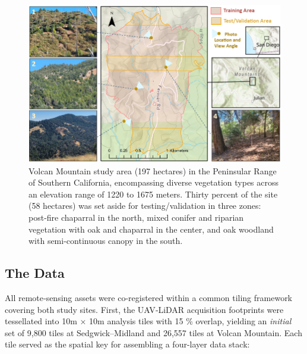 \documentclass[preprints,article,accept,pdftex,moreauthors]{Definitions/mdpi}
\begin{document}
\begin{figure}[!t]
    \centering
    \includegraphics[width=1\linewidth]{manuscript/figures/Volcan_Mtn_Study_Area.png}
    \caption{Volcan Mountain study area (197 hectares) in the Peninsular Range of Southern California, encompassing diverse vegetation types across an elevation range of 1220 to 1675 meters. Thirty percent of the site (58 hectares) was set aside for testing/validation in three zones: post-fire chaparral in the north, mixed conifer and riparian vegetation with oak and chaparral in the center, and oak woodland with semi-continuous canopy in the south. }
    \label{fig:volcan_mtn_study_area}
\end{figure}






\subsection{The Data}

All remote‐sensing assets were co-registered within a common tiling framework covering both study sites.  
First, the UAV‐LiDAR acquisition footprints were tessellated into 10m × 10m analysis tiles with 15 \% overlap, yielding an \emph{initial} set of 9,800 tiles at Sedgwick–Midland and 26,557 tiles at Volcan Mountain.  Each tile served as the spatial key for assembling a four-layer data stack:

\end{document}
